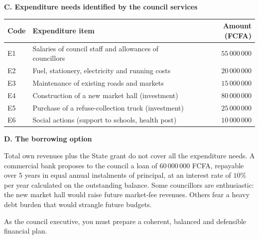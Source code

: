 \documentclass[11pt]{article}
\newcommand{\cle}[1]{{\popxbold\color{popdark}#1}}
\newcounter{popsec}
\newcounter{popsub}
\newcommand{\courssub}[1]{%
  \stepcounter{popsub}%
  \par\vspace{9pt}\noindent{\popxbold\fontsize{11.5}{13}\selectfont\color{popink}{\color{poporange}\thepopsec.\thepopsub}\hspace{6pt}#1}\par\nopagebreak\vspace{4pt}
}
\begin{document}
\textbf{C. Expenditure needs identified by the council services}

\begin{center}
\begin{tabularx}{\linewidth}{|l|X|r|}
\hline
\rowcolor{popblueL} \textbf{Code} & \textbf{Expenditure item} & \textbf{Amount (FCFA)} \\
\hline
E1 & Salaries of council staff and allowances of councillors & $55\,000\,000$ \\
\hline
E2 & Fuel, stationery, electricity and running costs & $20\,000\,000$ \\
\hline
E3 & Maintenance of existing roads and markets & $15\,000\,000$ \\
\hline
E4 & Construction of a new market hall (investment) & $80\,000\,000$ \\
\hline
E5 & Purchase of a refuse-collection truck (investment) & $25\,000\,000$ \\
\hline
E6 & Social actions (support to schools, health post) & $10\,000\,000$ \\
\hline
\end{tabularx}
\end{center}

\textbf{D. The borrowing option}

Total own revenues plus the State grant do not cover all the expenditure needs. A commercial bank proposes to the council a loan of $60\,000\,000$ FCFA, repayable over $5$ years in equal annual instalments of principal, at an interest rate of $10\%$ per year calculated on the outstanding balance. Some councillors are enthusiastic: the new market hall would raise future market-fee revenues. Others fear a heavy \cle{debt burden} that would strangle future budgets.

As the council executive, you must prepare a coherent, balanced and defensible financial plan.

\courssub{Tasks}
\end{document}
